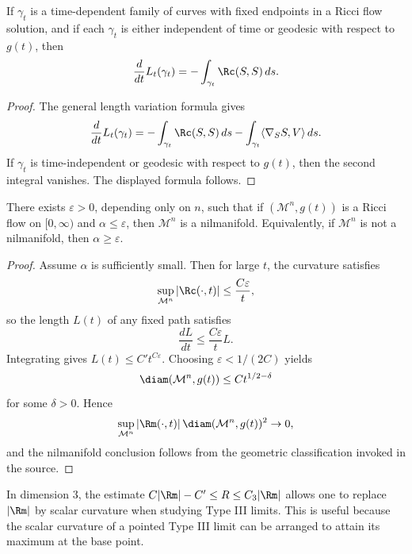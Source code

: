 \begin{corollary}
\label{ch08-cor-length-under-ricci-flow}
If \(\gamma_t\) is a time-dependent family of curves with fixed endpoints in a Ricci flow solution, and if each \(\gamma_t\) is either independent of time or geodesic with respect to \(g(t)\), then
\[
\frac{d}{dt}L_t(\gamma_t)=-\int_{\gamma_t}\Rc(S,S)\,ds.
\]
\end{corollary}

\begin{proof}
\sketch The general length variation formula gives
\[
\frac{d}{dt}L_t(\gamma_t)
= -\int_{\gamma_t}\Rc(S,S)\,ds
- \int_{\gamma_t}\langle \nabla_S S,V\rangle\,ds.
\]
If \(\gamma_t\) is time-independent or geodesic with respect to \(g(t)\), then the second integral vanishes. The displayed formula follows.
\end{proof}

\begin{proposition}
\label{ch08-prop-type-iii-lower-bound}
There exists \(\varepsilon>0\), depending only on \(n\), such that if \((\mathcal M^n,g(t))\) is a Ricci flow on \([0,\infty)\) and \(\alpha\le\varepsilon\), then \(\mathcal M^n\) is a nilmanifold. Equivalently, if \(\mathcal M^n\) is not a nilmanifold, then \(\alpha\ge\varepsilon\).
\end{proposition}

\begin{proof}
\sketch Assume \(\alpha\) is sufficiently small. Then for large \(t\), the curvature satisfies
\[
\sup_{\mathcal M^n}|\Rc(\cdot,t)|\le \frac{C\varepsilon}{t},
\]
so the length \(L(t)\) of any fixed path satisfies
\[
\frac{dL}{dt}\le \frac{C\varepsilon}{t}L.
\]
Integrating gives \(L(t)\le C' t^{C\varepsilon}\). Choosing \(\varepsilon<1/(2C)\) yields
\[
\diam(\mathcal M^n,g(t))\le Ct^{1/2-\delta}
\]
for some \(\delta>0\). Hence
\[
\sup_{\mathcal M^n}|\Rm(\cdot,t)|\,\diam(\mathcal M^n,g(t))^2\to0,
\]
and the nilmanifold conclusion follows from the geometric classification invoked in the source.
\end{proof}

\begin{remark}
\label{ch08-rem-type-iii-limits}
In dimension \(3\), the estimate \(C|\Rm|-C'\le R\le C_3|\Rm|\) allows one to replace \(|\Rm|\) by scalar curvature when studying Type III limits. This is useful because the scalar curvature of a pointed Type III limit can be arranged to attain its maximum at the base point.
\end{remark}

